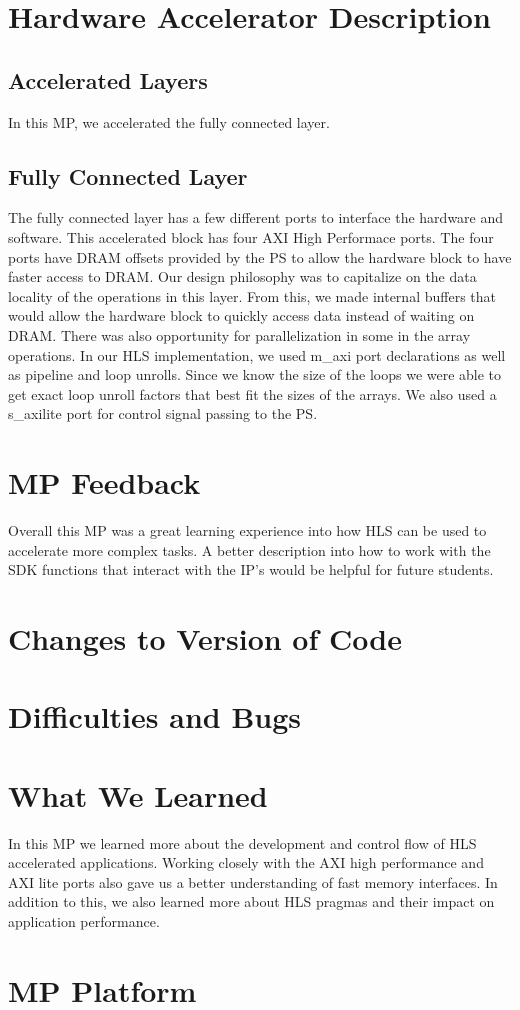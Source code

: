 \documentclass[letterpaper, 10 pt, conference]{IEEEconf}  %
\begin{document}
\section{Hardware Accelerator Description}
\subsection{Accelerated Layers}
In this MP, we accelerated the fully connected layer. 

\subsection{Fully Connected Layer}
The fully connected layer has a few different ports to interface the hardware and software. This accelerated block has four AXI High Performace ports. The four ports have DRAM offsets provided by the PS to allow the hardware block to have faster access to DRAM. Our design philosophy was to capitalize on the data locality of the operations in this layer. From this, we made internal buffers that would allow the hardware block to quickly access data instead of waiting on DRAM. There was also opportunity for parallelization in some in the array operations. In our HLS implementation, we used m\_axi port declarations as well as pipeline and loop unrolls. Since we know the size of the loops we were able to get exact loop unroll factors that best fit the sizes of the arrays. We also used a s\_axilite port for control signal passing to the PS. 



\section{MP Feedback}
Overall this MP was a great learning experience into how HLS can be used to accelerate more complex tasks. A better description into how to work with the SDK functions that interact with the IP's would be helpful for future students. 



\section{Changes to Version of Code}


\section{Difficulties and Bugs}



\section{What We Learned}
In this MP we learned more about the development and control flow of HLS accelerated applications. Working closely with the AXI high performance and AXI lite ports also gave us a better understanding of fast memory interfaces. In addition to this, we also learned more about HLS pragmas and their impact on application performance. 


\section{MP Platform}
\end{document}
